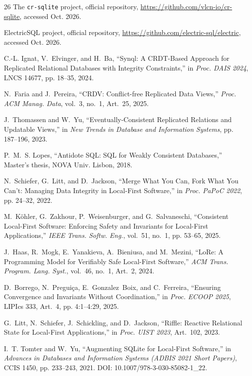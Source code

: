 \documentclass[conference]{IEEEtran}
\begin{document}
\begin{thebibliography}{26}
The \texttt{cr-sqlite} project, official repository, \url{https://github.com/vlcn-io/cr-sqlite}, accessed Oct. 2026.

ElectricSQL project, official repository, \url{https://github.com/electric-sql/electric}, accessed Oct. 2026.

C.-L. Ignat, V.~Elvinger, and H.~Ba, ``Synql: A CRDT-Based Approach for Replicated Relational Databases with Integrity Constraints,'' in \emph{Proc. DAIS 2024}, LNCS 14677, pp. 18--35, 2024.

N.~Faria and J.~Pereira, ``CRDV: Conflict-free Replicated Data Views,'' \emph{Proc. ACM Manag. Data}, vol.~3, no.~1, Art.~25, 2025.

J.~Thomassen and W.~Yu, ``Eventually-Consistent Replicated Relations and Updatable Views,'' in \emph{New Trends in Database and Information Systems}, pp. 187--196, 2023.

P.~M.~S. Lopes, ``Antidote SQL: SQL for Weakly Consistent Databases,'' Master's thesis, NOVA Univ. Lisbon, 2018.

N.~Schiefer, G.~Litt, and D.~Jackson, ``Merge What You Can, Fork What You Can't: Managing Data Integrity in Local-First Software,'' in \emph{Proc. PaPoC 2022}, pp. 24--32, 2022.

M.~K{\"o}hler, G.~Zakhour, P.~Weisenburger, and G.~Salvaneschi, ``Consistent Local-First Software: Enforcing Safety and Invariants for Local-First Applications,'' \emph{IEEE Trans. Softw. Eng.}, vol.~51, no.~1, pp. 53--65, 2025.

J.~Haas, R.~Mogk, E.~Yanakieva, A.~Bieniusa, and M.~Mezini, ``LoRe: A Programming Model for Verifiably Safe Local-First Software,'' \emph{ACM Trans. Program. Lang. Syst.}, vol.~46, no.~1, Art.~2, 2024.

D.~Borrego, N.~Pregui{\c{c}}a, E.~Gonzalez~Boix, and C.~Ferreira, ``Ensuring Convergence and Invariants Without Coordination,'' in \emph{Proc. ECOOP 2025}, LIPIcs 333, Art.~4, pp. 4:1--4:29, 2025.

G.~Litt, N.~Schiefer, J.~Schickling, and D.~Jackson, ``Riffle: Reactive Relational State for Local-First Applications,'' in \emph{Proc. UIST 2023}, Art.~102, 2023.

I.~T. Tomter and W.~Yu, ``Augmenting SQLite for Local-First Software,'' in \emph{Advances in Databases and Information Systems (ADBIS 2021 Short Papers)}, CCIS 1450, pp. 233--243, 2021. DOI: 10.1007/978-3-030-85082-1\_22.


\end{thebibliography}
\end{document}
